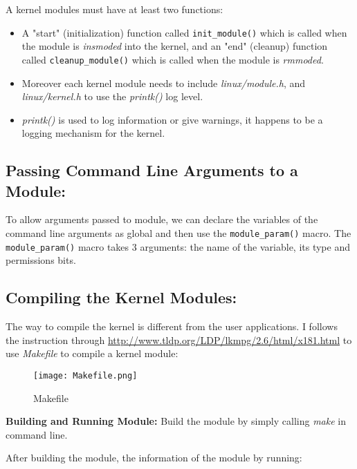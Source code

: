 \documentclass[a4paper, 11pt]{article}
\begin{document}
\par{A kernel modules must have at least two functions:}

\begin{itemize}
    \item A "start" (initialization) function called \texttt{init\_module()} which is called when the module is \textit{insmoded} into the kernel, and an "end" (cleanup) function called \texttt{cleanup\_module()} which is called when the module is \textit{rmmoded}.
    \item Moreover each kernel module needs to include \textit{linux/module.h}, and \textit{linux/kernel.h} to use the \textit{printk()} log level.
    \item \textit{printk()} is used to log information or give warnings, it happens to be a logging mechanism for the kernel. 
\end{itemize}

\subsection{Passing Command Line Arguments to a Module:}

\par{To allow arguments passed to module, we can declare the variables of the command line arguments as global and then use the \texttt{module\_param()} macro. The \texttt{module\_param()} macro takes 3 arguments: the name of the variable, its type and permissions bits}.

\subsection{Compiling the Kernel Modules:}

\par{The way to compile the kernel is different from the user applications. I follows the instruction through \url{http://www.tldp.org/LDP/lkmpg/2.6/html/x181.html} to use \textit{Makefile} to compile a kernel module:}

\begin{figure}[h!]
    \texttt{[image: Makefile.png]}
    \caption{Makefile}
    \bigbreak
\end{figure}

\newpage

\par{\textbf{Building and Running Module:} Build the module by simply calling \textit{make} in command line.}
\par{After building the module, the information of the module by running:}
\end{document}
